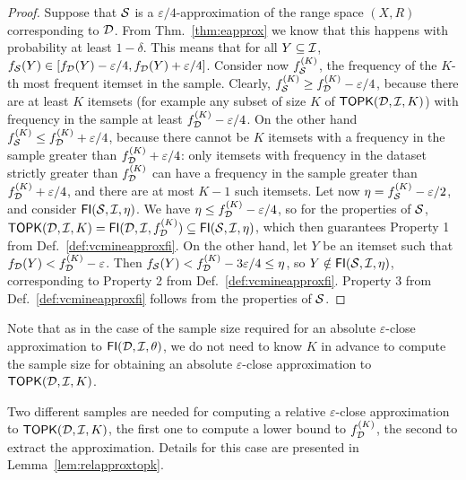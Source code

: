 \begin{proof}
  Suppose that ${\cal S}$ is a $\varepsilon/4$-approximation of the range
  space $(X,R)$ corresponding to ${\cal D}$. From Thm.~\ref{thm:eapprox} we know that
  this happens with probability at least $1-\delta$. This means that for all
  $Y\subseteq{\cal I}$,
  $f_{\cal S}(Y)\in[f_{\cal D}(Y)-\varepsilon/4,f_{\cal D}(Y)+\varepsilon/4]$.
  Consider now $f_{\cal S}^{(K)}$, the frequency of the $K$-th most frequent itemset
  in the sample. Clearly, $f_{\cal S}^{(K)}\ge f_{\cal D}^{(K)}-\varepsilon/4$,
  because there are at least $K$ itemsets (for example any subset of size $K$ of
  $\mathsf{TOPK}({\cal D},{\cal I},K)$) with frequency in the sample at least
  $f_{\cal D}^{(K)}-\varepsilon/4$. On the other hand $f_{\cal S}^{(K)}\le
  f_{\cal D}^{(K)}+\varepsilon/4$, because there cannot be $K$ itemsets with a
  frequency in the sample greater than $f_{\cal D}^{(K)}+\varepsilon/4$: only
  itemsets with frequency in the dataset strictly greater than $f_{\cal D}^{(K)}$ can
  have a frequency in the sample greater than
  $f_{\cal D}^{(K)}+\varepsilon/4$, and there are at most $K-1$ such
  itemsets. Let now $\eta=f_{\cal S}^{(K)}-\varepsilon/2$, and consider
  $\mathsf{FI}({\cal S},{\cal I},\eta)$. We have $\eta\le f_{\cal D}^{(K)}-\varepsilon/4$, so
  for the properties of ${\cal S}$,
  $\mathsf{TOPK}({\cal D},{\cal I},K)=\mathsf{FI}({\cal D},{\cal I},f_{\cal D}^{(K)})\subseteq\mathsf{FI}({\cal S},{\cal I},\eta)$,
  which then guarantees Property 1 from Def.~\ref{def:vcmineapproxfi}. On
  the other hand, let $Y$ be an itemset such that
  $f_{\cal D}(Y)<f_{\cal D}^{(K)}-\varepsilon$. Then $f_{\cal S}(Y)<
  f_{\cal D}^{(K)}-3\varepsilon/4\le\eta$, so $Y\notin\mathsf{FI}({\cal S},{\cal I},\eta)$,
  corresponding to Property 2 from Def.~\ref{def:vcmineapproxfi}. Property 3 from
  Def.~\ref{def:vcmineapproxfi} follows from the properties of ${\cal S}$.
\end{proof}

Note that as in the case of the sample size required
for an absolute $\varepsilon$-close approximation to $\mathsf{FI}({\cal D},{\cal I},\theta)$, we do
not need to know $K$ in advance to compute the sample size for obtaining
an absolute $\varepsilon$-close approximation to $\mathsf{TOPK}({\cal D},{\cal I},K)$.

Two different samples are needed for computing a relative
$\varepsilon$-close approximation to $\mathsf{TOPK}({\cal D},{\cal I},K)$, the first one to compute a
lower bound to $f_{\cal D}^{(K)}$, the second to extract the approximation. Details
for this case are presented in Lemma~\ref{lem:relapproxtopk}.


